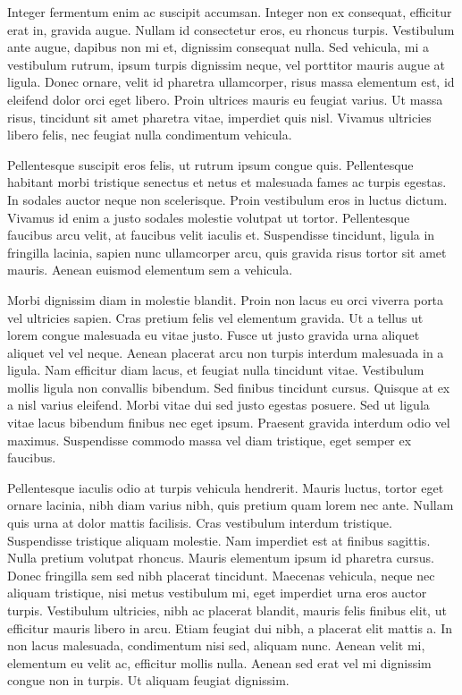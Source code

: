 Integer fermentum enim ac suscipit accumsan. Integer non ex consequat, efficitur erat in, gravida augue. Nullam id consectetur eros, eu rhoncus turpis. Vestibulum ante augue, dapibus non mi et, dignissim consequat nulla. Sed vehicula, mi a vestibulum rutrum, ipsum turpis dignissim neque, vel porttitor mauris augue at ligula. Donec ornare, velit id pharetra ullamcorper, risus massa elementum est, id eleifend dolor orci eget libero. Proin ultrices mauris eu feugiat varius. Ut massa risus, tincidunt sit amet pharetra vitae, imperdiet quis nisl. Vivamus ultricies libero felis, nec feugiat nulla condimentum vehicula.

Pellentesque suscipit eros felis, ut rutrum ipsum congue quis. Pellentesque habitant morbi tristique senectus et netus et malesuada fames ac turpis egestas. In sodales auctor neque non scelerisque. Proin vestibulum eros in luctus dictum. Vivamus id enim a justo sodales molestie volutpat ut tortor. Pellentesque faucibus arcu velit, at faucibus velit iaculis et. Suspendisse tincidunt, ligula in fringilla lacinia, sapien nunc ullamcorper arcu, quis gravida risus tortor sit amet mauris. Aenean euismod elementum sem a vehicula.

Morbi dignissim diam in molestie blandit. Proin non lacus eu orci viverra porta vel ultricies sapien. Cras pretium felis vel elementum gravida. Ut a tellus ut lorem congue malesuada eu vitae justo. Fusce ut justo gravida urna aliquet aliquet vel vel neque. Aenean placerat arcu non turpis interdum malesuada in a ligula. Nam efficitur diam lacus, et feugiat nulla tincidunt vitae. Vestibulum mollis ligula non convallis bibendum. Sed finibus tincidunt cursus. Quisque at ex a nisl varius eleifend. Morbi vitae dui sed justo egestas posuere. Sed ut ligula vitae lacus bibendum finibus nec eget ipsum. Praesent gravida interdum odio vel maximus. Suspendisse commodo massa vel diam tristique, eget semper ex faucibus.

Pellentesque iaculis odio at turpis vehicula hendrerit. Mauris luctus, tortor eget ornare lacinia, nibh diam varius nibh, quis pretium quam lorem nec ante. Nullam quis urna at dolor mattis facilisis. Cras vestibulum interdum tristique. Suspendisse tristique aliquam molestie. Nam imperdiet est at finibus sagittis. Nulla pretium volutpat rhoncus. Mauris elementum ipsum id pharetra cursus. Donec fringilla sem sed nibh placerat tincidunt. Maecenas vehicula, neque nec aliquam tristique, nisi metus vestibulum mi, eget imperdiet urna eros auctor turpis. Vestibulum ultricies, nibh ac placerat blandit, mauris felis finibus elit, ut efficitur mauris libero in arcu. Etiam feugiat dui nibh, a placerat elit mattis a. In non lacus malesuada, condimentum nisi sed, aliquam nunc. Aenean velit mi, elementum eu velit ac, efficitur mollis nulla. Aenean sed erat vel mi dignissim congue non in turpis. Ut aliquam feugiat dignissim.

